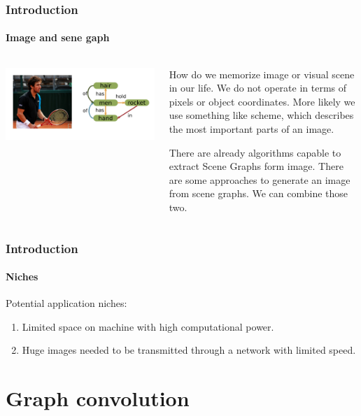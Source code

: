 \documentclass[10pt]{beamer}
\begin{document}
\begin{frame}
    \frametitle{Introduction}
    \framesubtitle{Image and sene gaph}
    \begin{columns}
        \begin{column}{0.5\textwidth}
            \includegraphics[width=\textwidth]{figure/image-and-scene-graph.png}
        \end{column}
        \begin{column}{0.5\textwidth}
            How do we memorize image or visual scene in our life. We do not operate in terms of pixels or object coordinates. More likely we use something like scheme, which describes the most important parts of an image.

            There are already algorithms capable to extract Scene Graphs form image. There are some approaches to generate an image from scene graphs. We can combine those two.
        \end{column}
    \end{columns}
\end{frame}

\begin{frame}
    \frametitle{Introduction}
    \framesubtitle{Niches}
    Potential application niches:

    \begin{enumerate}
        \item Limited space on machine with high computational power.
        \item Huge images needed to be transmitted through a network with limited speed.
    \end{enumerate}
\end{frame}

\section{Graph convolution}
\end{document}
